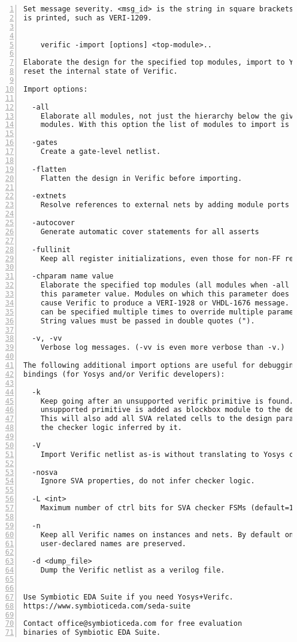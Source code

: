 \begin{lstlisting}[numbers=left,frame=single]
Set message severity. <msg_id> is the string in square brackets when a message
is printed, such as VERI-1209.


    verific -import [options] <top-module>..

Elaborate the design for the specified top modules, import to Yosys and
reset the internal state of Verific.

Import options:

  -all
    Elaborate all modules, not just the hierarchy below the given top
    modules. With this option the list of modules to import is optional.

  -gates
    Create a gate-level netlist.

  -flatten
    Flatten the design in Verific before importing.

  -extnets
    Resolve references to external nets by adding module ports as needed.

  -autocover
    Generate automatic cover statements for all asserts

  -fullinit
    Keep all register initializations, even those for non-FF registers.

  -chparam name value 
    Elaborate the specified top modules (all modules when -all given) using
    this parameter value. Modules on which this parameter does not exist will
    cause Verific to produce a VERI-1928 or VHDL-1676 message. This option
    can be specified multiple times to override multiple parameters.
    String values must be passed in double quotes (").

  -v, -vv
    Verbose log messages. (-vv is even more verbose than -v.)

The following additional import options are useful for debugging the Verific
bindings (for Yosys and/or Verific developers):

  -k
    Keep going after an unsupported verific primitive is found. The
    unsupported primitive is added as blockbox module to the design.
    This will also add all SVA related cells to the design parallel to
    the checker logic inferred by it.

  -V
    Import Verific netlist as-is without translating to Yosys cell types. 

  -nosva
    Ignore SVA properties, do not infer checker logic.

  -L <int>
    Maximum number of ctrl bits for SVA checker FSMs (default=16).

  -n
    Keep all Verific names on instances and nets. By default only
    user-declared names are preserved.

  -d <dump_file>
    Dump the Verific netlist as a verilog file.


Use Symbiotic EDA Suite if you need Yosys+Verifc.
https://www.symbioticeda.com/seda-suite

Contact office@symbioticeda.com for free evaluation
binaries of Symbiotic EDA Suite.
\end{lstlisting}

